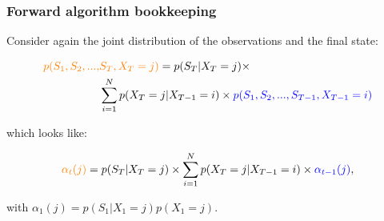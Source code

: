 \documentclass[main.tex]{subfiles}
\begin{document}
\begin{frame}
\frametitle{Forward algorithm bookkeeping}

Consider again the joint distribution of the observations and the final state:

\begin{equation}
    \begin{aligned}
    \textcolor{orange}{p(S_1, S_2, ..., }&\textcolor{orange}{S_T, X_T=j)} = p(S_T | X_T = j) \times\\ &\sum_{i=1}^N p(X_T=j | X_{T-1}=i) \times \textcolor{blue}{p(S_1, S_2, ..., S_{T-1}, X_{T-1}=i)}
    \end{aligned}
\end{equation}

which looks like:

\begin{equation}
    \begin{aligned}
    \textcolor{orange}{\alpha_t(j)} = p(S_T | X_T = j) \times\sum_{i=1}^N p(X_T=j | X_{T-1}=i) \times \textcolor{blue}{\alpha_{t-1}(j)},
    \end{aligned}
\end{equation}

with $\alpha_1(j)=p(S_1 | X_1 = j)p(X_1=j)$.
    
\end{frame}
\end{document}
